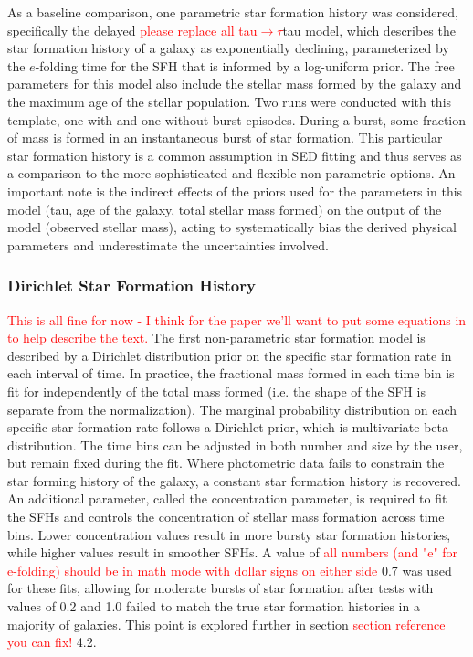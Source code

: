 \documentclass[twocolumn]{aastex62}
\newcommand{\red}[1]{{\textcolor{red}{#1}}}
\begin{document}
As a baseline comparison, one parametric star formation history was considered, specifically the delayed \red{please replace all tau$\rightarrow \tau$}tau model, which describes the star formation history of a galaxy as exponentially declining, parameterized by the $e$-folding time for the SFH that is informed by a log-uniform prior. The free parameters for this model also include the stellar mass formed by the galaxy and the maximum age of the stellar population. Two runs were conducted with this template, one with and one without burst episodes. During a burst, some fraction of mass is formed in an instantaneous burst of star formation. This particular star formation history is a common assumption in SED fitting and thus serves as a comparison to the more sophisticated and flexible non parametric options. An important note is the indirect effects of the priors used for the parameters in this model (tau, age of the galaxy, total stellar mass formed) on the output of the model (observed stellar mass), acting to systematically bias the derived physical parameters and underestimate the uncertainties involved.  


\subsubsection{Dirichlet Star Formation History}
\label{section:dirichlet}

\red{This is all fine for now - I think for the paper we'll want to put some equations in to help describe the text.} The first non-parametric star formation model is described by a Dirichlet distribution prior on the specific star formation rate in each interval of time. In practice, the fractional mass formed in each time bin is fit for independently of the total mass formed (i.e. the shape of the SFH is separate from the normalization). The marginal probability distribution on each specific star formation rate follows a Dirichlet prior, which is multivariate beta distribution. The time bins can be adjusted in both number and size by the user, but remain fixed during the fit. Where photometric data fails to constrain the star forming history of the galaxy, a constant star formation history is recovered. An additional parameter, called the concentration parameter, is required to fit the SFHs and controls the concentration of stellar mass formation across time bins. Lower concentration values result in more bursty star formation histories, while higher values result in smoother SFHs. A value of \red{all numbers (and "e" for e-folding) should be in math mode with dollar signs on either side} 0.7 was used for these fits, allowing for moderate bursts of star formation after tests with values of 0.2 and 1.0 failed to match the true star formation histories in a majority of galaxies. This point is explored further in section \red{section reference you can fix!} 4.2. 
\end{document}
